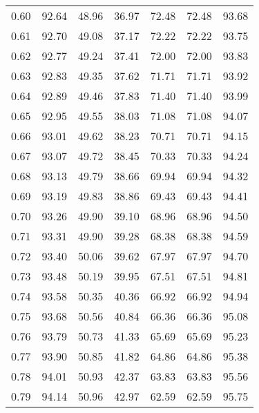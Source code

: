 \begin{tabular}{|c|c|c|c|c|c|c|}
      0.60 &     92.64 &     48.96 &      36.97 &   72.48 &      72.48 &         93.68 \\
      0.61 &     92.70 &     49.08 &      37.17 &   72.22 &      72.22 &         93.75 \\
      0.62 &     92.77 &     49.24 &      37.41 &   72.00 &      72.00 &         93.83 \\
      0.63 &     92.83 &     49.35 &      37.62 &   71.71 &      71.71 &         93.92 \\
      0.64 &     92.89 &     49.46 &      37.83 &   71.40 &      71.40 &         93.99 \\
      0.65 &     92.95 &     49.55 &      38.03 &   71.08 &      71.08 &         94.07 \\
      0.66 &     93.01 &     49.62 &      38.23 &   70.71 &      70.71 &         94.15 \\
      0.67 &     93.07 &     49.72 &      38.45 &   70.33 &      70.33 &         94.24 \\
      0.68 &     93.13 &     49.79 &      38.66 &   69.94 &      69.94 &         94.32 \\
      0.69 &     93.19 &     49.83 &      38.86 &   69.43 &      69.43 &         94.41 \\
      0.70 &     93.26 &     49.90 &      39.10 &   68.96 &      68.96 &         94.50 \\
      0.71 &     93.31 &     49.90 &      39.28 &   68.38 &      68.38 &         94.59 \\
      0.72 &     93.40 &     50.06 &      39.62 &   67.97 &      67.97 &         94.70 \\
      0.73 &     93.48 &     50.19 &      39.95 &   67.51 &      67.51 &         94.81 \\
      0.74 &     93.58 &     50.35 &      40.36 &   66.92 &      66.92 &         94.94 \\
      0.75 &     93.68 &     50.56 &      40.84 &   66.36 &      66.36 &         95.08 \\
      0.76 &     93.79 &     50.73 &      41.33 &   65.69 &      65.69 &         95.23 \\
      0.77 &     93.90 &     50.85 &      41.82 &   64.86 &      64.86 &         95.38 \\
      0.78 &     94.01 &     50.93 &      42.37 &   63.83 &      63.83 &         95.56 \\
      0.79 &     94.14 &     50.96 &      42.97 &   62.59 &      62.59 &         95.75 \\

\end{tabular}
